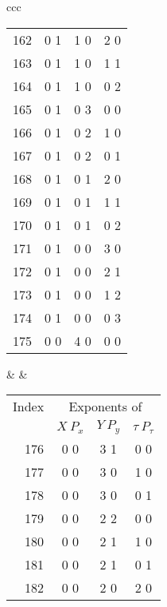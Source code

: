 {\begin{center}
\begin{tabular}{ccc}
\begin{tabular}{rccc}
162\hspace*{.125in}&0 1&1 0&2 0\\
163\hspace*{.125in}&0 1&1 0&1 1\\
164\hspace*{.125in}&0 1&1 0&0 2\\
165\hspace*{.125in}&0 1&0 3&0 0\\
166\hspace*{.125in}&0 1&0 2&1 0\\
167\hspace*{.125in}&0 1&0 2&0 1\\
168\hspace*{.125in}&0 1&0 1&2 0\\
169\hspace*{.125in}&0 1&0 1&1 1\\
170\hspace*{.125in}&0 1&0 1&0 2\\
171\hspace*{.125in}&0 1&0 0&3 0\\
172\hspace*{.125in}&0 1&0 0&2 1\\
173\hspace*{.125in}&0 1&0 0&1 2\\
174\hspace*{.125in}&0 1&0 0&0 3\\
175\hspace*{.125in}&0 0&4 0&0 0
\end{tabular} & \hspace*{1in} &
\begin{tabular}{rccc}
\multicolumn{1}{c}{Index} &
\multicolumn{3}{c}{Exponents of}\\
&$X\:P_x$&$Y\:P_y$&$\tau\:P_\tau$\\
176\hspace*{.125in}&0 0&3 1&0 0\\
177\hspace*{.125in}&0 0&3 0&1 0\\
178\hspace*{.125in}&0 0&3 0&0 1\\
179\hspace*{.125in}&0 0&2 2&0 0\\
180\hspace*{.125in}&0 0&2 1&1 0\\
181\hspace*{.125in}&0 0&2 1&0 1\\
182\hspace*{.125in}&0 0&2 0&2 0\\

\end{tabular}
\end{tabular}
\end{center}}
